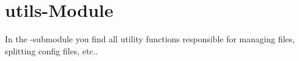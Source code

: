 \chapter{utils-Module}

In the -submodule you find all utility functions responsible for managing
files, splitting config files, etc..
